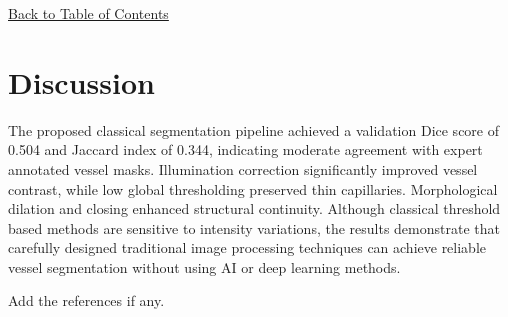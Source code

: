 \documentclass[12pt,a4paper]{article}
\begin{document}
\hyperref[contents]{\small Back to Table of Contents}
\newpage

\section*{Discussion}

The proposed classical segmentation pipeline achieved a validation Dice score of 0.504 and Jaccard index of 0.344, indicating moderate agreement with expert annotated vessel masks. Illumination correction significantly improved vessel contrast, while low global thresholding preserved thin capillaries. Morphological dilation and closing enhanced structural continuity. Although classical threshold based methods are sensitive to intensity variations, the results demonstrate that carefully designed traditional image processing techniques can achieve reliable vessel segmentation without using AI or deep learning methods.



 

Add the references if any.
\end{document}
